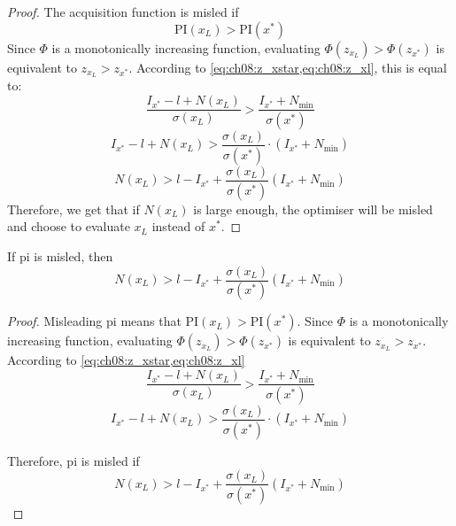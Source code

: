 \begin{proof}
The acquisition function is misled if
\begin{equation*}
    \mathrm{PI}(x_L) > \mathrm{PI}(x^*)
\end{equation*}
Since $\Phi$ is a monotonically increasing function, evaluating $\Phi(z_{x_L}) > \Phi(z_{x^*})$ is equivalent to $z_{x_L} > z_{x^*}$. According to \cref{eq:ch08:z_xstar,eq:ch08:z_xl}, this is equal to:
\begin{equation*}
    \frac{I_{x^*} - l + N(x_L)}{\sigma(x_L)} > \frac{I_{x^*} + N_{\min}}{\sigma(x^*)}
\end{equation*}
\begin{equation*}
    I_{x^*} - l + N(x_L) > \frac{\sigma(x_L)}{\sigma(x^*)} \cdot (I_{x^*} + N_{\min})
\end{equation*}
\begin{equation*}
    N(x_L) > l - I_{x^*} + \frac{\sigma(x_L)}{\sigma(x^*)} (I_{x^*} + N_{\min})
\end{equation*}
Therefore, we get that if $N(x_L)$ is large enough, the optimiser will be misled and choose to evaluate $x_L$ instead of $x^*$.
\end{proof}

\begin{theorem}
If \gls{pi} is misled, then
\begin{equation*}
    N(x_L) > l - I_{x^*} + \frac{\sigma(x_L)}{\sigma(x^*)} (I_{x^*} + N_{\min})
\end{equation*}

\end{theorem}

\begin{proof}
Misleading \gls{pi} means that $\mathrm{PI}(x_L) > \mathrm{PI}(x^*)$. Since $\Phi$ is a monotonically increasing function, evaluating $\Phi(z_{x_L}) > \Phi(z_{x^*})$ is equivalent to $z_{x_L} > z_{x^*}$. According to \cref{eq:ch08:z_xstar,eq:ch08:z_xl}
\begin{equation*}
    \frac{I_{x^*} - l + N(x_L)}{\sigma(x_L)} > \frac{I_{x^*} + N_{\min}}{\sigma(x^*)}
\end{equation*}
\begin{equation*}
    I_{x^*} - l + N(x_L) > \frac{\sigma(x_L)}{\sigma(x^*)} \cdot (I_{x^*} + N_{\min})
\end{equation*}

Therefore, \gls{pi} is misled if
\begin{equation*}
    N(x_L) > l - I_{x^*} + \frac{\sigma(x_L)}{\sigma(x^*)} (I_{x^*} + N_{\min})
\end{equation*}
\end{proof}

